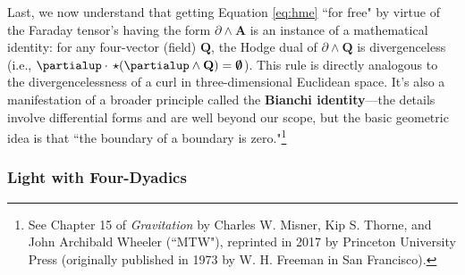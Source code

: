 \documentclass[12pt]{article}
\renewcommand{\vv}[1]{\mathbf{#1}}
\begin{document}
Last, we now understand that getting Equation \ref{eq:hme} ``for free" by virtue of the Faraday tensor's having the form $\partialup \wedge \vv A$ is an instance of a mathematical identity: for any four-vector (field) $\vv Q$, the Hodge dual of $\partialup \wedge \vv Q$ is divergenceless (i.e., $\partialup \cdot \, \star ( \partialup \wedge \vv Q ) = \textrm{\mbox{\boldmath $\emptyset$}}$). This rule is directly analogous to the divergencelessness of a curl in three-dimensional Euclidean space. It's also a manifestation of a broader principle called the \textbf{Bianchi identity}---the details involve differential forms and are well beyond our scope, but the basic geometric idea is that ``the boundary of a boundary is zero."\footnote{See Chapter 15 of \emph{Gravitation} by Charles W. Misner, Kip S. Thorne, and John Archibald Wheeler (``MTW"), reprinted in 2017 by Princeton University Press (originally published in 1973 by W. H. Freeman in San Francisco).}


\subsubsection{Light with Four-Dyadics}
\end{document}
